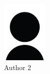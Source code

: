 \begin{figure}
\begin{subfigure}[b]{0.2\textwidth}
        \includegraphics[width=\textwidth]{figs/cv/author}
        \caption{Author 2}
        \label{fig:c1:auth2}
    \end{subfigure}
    \hfill
    \begin{subfigure}[b]{0.2\textwidth}
        \centering

\end{subfigure}
\end{figure}
